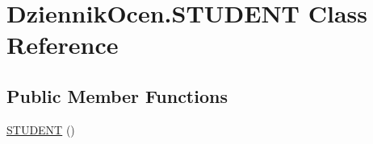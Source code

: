 \hypertarget{class_dziennik_ocen_1_1_s_t_u_d_e_n_t}{}\section{Dziennik\+Ocen.\+S\+T\+U\+D\+E\+NT Class Reference}
\label{class_dziennik_ocen_1_1_s_t_u_d_e_n_t}
\subsection*{Public Member Functions}
\begin{DoxyCompactItemize}
\item 
\hyperlink{class_dziennik_ocen_1_1_s_t_u_d_e_n_t_a9f8f6a2de89a04f6819ac7c9d750286d}{S\+T\+U\+D\+E\+NT} ()
\end{DoxyCompactItemize}
